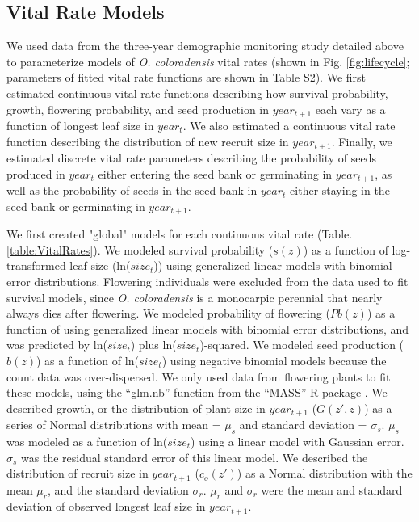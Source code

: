 \documentclass[12pt, letterpaper]{article}
\begin{document}
\subsection{Vital Rate Models}
We used data from the three-year demographic monitoring study detailed above to parameterize models of \textit{O. coloradensis} vital rates (shown in Fig. \ref{fig:lifecycle}; parameters of fitted vital rate functions are shown in Table S2). We first estimated continuous vital rate functions describing how survival probability, growth, flowering probability, and seed production in $year_{t+1}$ each vary as a function of longest leaf size in $year_{t}$. We also estimated a continuous vital rate function describing the distribution of new recruit size in $year_{t+1}$. Finally, we estimated discrete vital rate parameters describing the probability of seeds produced in $year_{t}$ either entering the seed bank or germinating in $year_{t+1}$, as well as the probability of seeds in the seed bank in $year_{t}$ either staying in the seed bank or germinating in $year_{t+1}$.  

We first created "global" models for each continuous vital rate (Table. \ref{table:VitalRates}). 
We modeled survival probability ($s(z)$) as a function of log-transformed leaf size (ln($size_t$)) using generalized linear models with binomial error distributions. Flowering individuals were excluded from the data used to fit survival models, since \textit{O. coloradensis} is a monocarpic perennial that nearly always dies after flowering.
We modeled probability of flowering ($Pb(z)$) as a function of using generalized linear models with binomial error distributions, and was predicted by ln($size_t$) plus ln($size_t$)-squared. 
We modeled seed production ($b(z)$) as a function of ln($size_t$) using negative binomial models because the count data was over-dispersed. We only used data from flowering plants to fit these models, using the “glm.nb” function from the “MASS” R package \cite{Venables2002ModernS}.
We described growth, or the distribution of plant size in $year_{t+1}$ ($G(z',z)$) as a series of Normal distributions with mean = $\mu_s$ and standard deviation = $\sigma_s$. $\mu_s$ was modeled as a function of ln($size_t$) using a linear model with Gaussian error. $\sigma_s$ was the residual standard error of this linear model. 
We described the distribution of recruit size in $year_{t+1}$ ($c_o(z')$) as a Normal distribution with the mean $\mu_r$, and the standard deviation $\sigma_r$. $\mu_r$ and $\sigma_r$ were the mean and standard deviation of observed longest leaf size in $year_{t+1}$.
\end{document}

